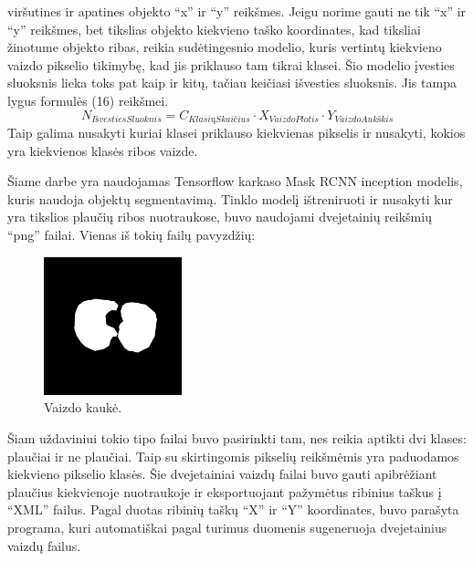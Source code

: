 \documentclass{VUMIFInfKursinis}
\begin{document}
viršutines ir apatines objekto \enquote{x} ir \enquote{y} reikšmes. Jeigu norime gauti ne tik \enquote{x} ir \enquote{y} reikšmes, bet tikslias
objekto kiekvieno taško koordinates, kad tiksliai žinotume objekto ribas, reikia sudėtingesnio modelio,
kuris vertintų kiekvieno vaizdo pikselio tikimybę, kad jis priklauso tam tikrai klasei.
Šio modelio įvesties sluoksnis lieka toks pat kaip ir kitų, tačiau keičiasi išvesties sluoksnis. Jis tampa
lygus formulės (16) reikšmei.
\begin{equation}
N_{IšvestiesSluoknis} = C_{KlasiųSkaičius} \cdot X_{VaizdoPlotis} \cdot Y_{VaizdoAukškis}
\end{equation}
Taip galima nusakyti kuriai klasei priklauso kiekvienas pikselis ir nusakyti, kokios yra
kiekvienos klasės ribos vaizde.
\par
Šiame darbe yra naudojamas Tensorflow karkaso Mask RCNN inception modelis, kuris naudoja
objektų segmentavimą. Tinklo modelį ištreniruoti ir nusakyti kur yra tikslios plaučių
ribos nuotraukose, buvo naudojami dvejetainių reikšmių \enquote{png} failai. Vienas iš tokių
failų pavyzdžių:

\begin{figure}[ht]
  \centering
  \includegraphics[width=4cm,height=4cm,keepaspectratio]{mask.png}
  \caption{Vaizdo kaukė.}
  \label{fig:kaukė1}
\end{figure}

\par
Šiam uždaviniui tokio tipo failai buvo pasirinkti tam, nes reikia aptikti dvi klases:
plaučiai ir ne plaučiai. Taip su skirtingomis pikselių reikšmėmis yra paduodamos kiekvieno
pikselio klasės. Šie dvejetainiai vaizdų failai buvo gauti apibrėžiant plaučius kiekvienoje
nuotraukoje ir eksportuojant pažymėtus ribinius taškus į \enquote{XML} failus. Pagal duotas ribinių
taškų \enquote{X} ir \enquote{Y} koordinates, buvo parašyta programa, kuri automatiškai pagal turimus
duomenis sugeneruoja dvejetainius vaizdų failus.

\end{document}
